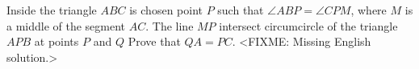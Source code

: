 \problem{}
Inside the triangle $ABC$ is chosen point $P$ such that $\angle ABP = \angle CPM$, where $M$ is a middle of the segment $AC$.
The line $MP$ intersect circumcircle of the triangle $APB$ at points $P$ and $Q$
Prove that $QA = PC$.
\solution
<FIXME: Missing English solution.>
\endproblem
